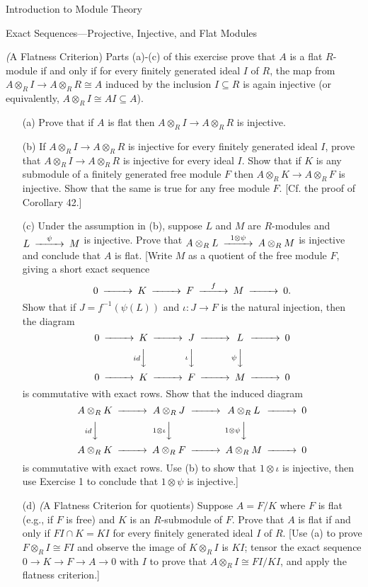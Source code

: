 \begin{chapter}{Introduction to Module Theory}
\begin{section}{Exact Sequences---Projective, Injective, and Flat Modules}
\begin{problem}\label{ex:10.5.25}
\emph(A Flatness Criterion) Parts (a)-(c) of this exercise prove that $A$ is a flat $R$-module if and only if for every finitely generated ideal $I$ of $R$, the map from $A\otimes_RI\to A\otimes_RR\cong A$ induced by the inclusion $I\subseteq R$ is again injective (or equivalently, $A\otimes_RI\cong AI\subseteq A$). \begin{enumerate}
\item[(a)] Prove that if $A$ is flat then $A\otimes_RI\to A\otimes_RR$ is injective.
\item[(b)] If $A\otimes_RI\to A\otimes_RR$ is injective for every finitely generated ideal $I$, prove that $A\otimes_RI\to A\otimes_RR$ is injective for every ideal $I$. Show that if $K$ is any submodule of a finitely generated free module $F$ then $A\otimes_RK\to A\otimes_RF$ is injective. Show that the same is true for any free module $F$. [Cf. the proof of Corollary 42.]
\item[(c)]Under the assumption in (b), suppose $L$ and $M$ are $R$-modules and $\begin{CD}L@>\psi>>M\end{CD}$ is injective. Prove that $\begin{CD}A\otimes_RL@>1\otimes\psi>>A\otimes_RM\end{CD}$ is injective and conclude that $A$ is flat. [Write $M$ as a quotient of the free module $F$, giving a short exact sequence\[
\begin{CD}0@>>>K@>>>F@>f>>M@>>>0.\end{CD}
\]
Show that if $J=f^{-1}(\psi(L))$ and $\iota:J\to F$ is the natural injection, then the diagram\[
\begin{CD}
0@>>>K@>>>J@>>>L@>>>0\\
@.@VidVV@V\iota VV @V\psi VV\\
0@>>>K@>>>F@>>>M@>>>0
\end{CD}
\]
is commutative with exact rows. Show that the induced diagram\[
\begin{CD}
A\otimes_R K@>>>A\otimes_R J@>>>A\otimes_R L@>>>0\\
@VidVV@V1\otimes \iota VV @V1\otimes\psi VV\\
A\otimes_R K@>>>A\otimes_R F@>>>A\otimes_R M@>>>0
\end{CD}
\]
is commutative with exact rows. Use (b) to show that $1\otimes \iota$ is injective, then use Exercise 1 to conclude that $1\otimes \psi $ is injective.]
\item[(d)]  \emph(A Flatness Criterion for quotients) Suppose $A=F/K$ where $F$ is flat (e.g., if $F$ is free) and $K$ is an $R$-submodule of $F$. Prove that $A$ is flat if and only if $FI\cap K = KI$ for every finitely generated ideal $I$ of $R$. [Use (a) to prove $F\otimes_R I\cong FI$ and observe the image of $K\otimes_RI$ is $KI$; tensor the exact sequence $0\to K\to F\to A\to0$ with $I$ to prove that $A\otimes_RI\cong FI/KI$, and apply the flatness criterion.]

\end{enumerate}
\end{problem}
\end{section}
\end{chapter}

